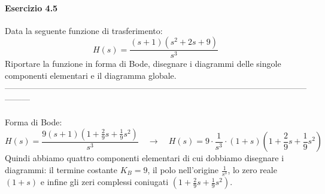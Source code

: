 \documentclass[12pt,a4paper]{article}
\begin{document}
	\paragraph{Esercizio 4.5} Data la seguente funzione di trasferimento:
	\[
		H(s) = \frac{(s+1)(s^2+2s+9)}{s^3}
	\]
	Riportare la funzione in forma di Bode, disegnare i diagrammi delle singole componenti elementari e il diagramma globale.\\
	---------------------------------------------------------------------------------------------------------------------\\ \\
	Forma di Bode:
	\[
		H(s) = \frac{9(s+1)\left(1+\frac{2}{9}s+\frac{1}{9}s^2\right)}{s^3}\quad\rightarrow\quad H(s) = 9 \cdot \frac{1}{s^3}\cdot (1+s)\left(1+\frac{2}{9}s+\frac{1}{9}s^2\right)
	\]
	Quindi abbiamo quattro componenti elementari di cui dobbiamo disegnare i diagrammi: il termine costante $K_B = 9$, il polo nell'origine $\frac{1}{s^3}$, lo zero reale $(1+s)$ e infine gli zeri complessi coniugati $\left(1+\frac{2}{9}s+\frac{1}{9}s^2\right)$.\\
\end{document}
